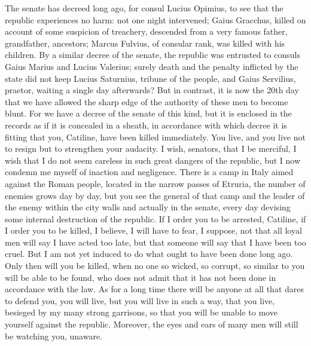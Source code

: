\documentclass[a4paper]{article}
\begin{document}
\begin{pairs}
\begin{Rightside}
    The senate has decreed long ago, for consul Lucius Opimius, to see that the republic experiences no harm: not one night intervened; Gaius Gracchus, killed on account of some suspicion of treachery, descended from a very famous father, grandfather, ancestors; Marcus Fulvius, of consular rank, was killed with his children. By a similar decree of the senate, the republic was entrusted to consuls Gaius Marius and Lucius Valerius; surely death and the penalty inflicted by the state did not keep Lucius Saturnius, tribune of the people, and Gaius Servilius, praetor, waiting a single day afterwards? But in contrast, it is now the 20th day that we have allowed the sharp edge of the authority of these men to become blunt. For we have a decree of the senate of this kind, but it is enclosed in the records as if it is concealed in a sheath, in accordance with which decree it is fitting that you, Catiline, have been killed immediately. You live, and you live not to resign but to strengthen your audacity. I wish, senators, that I be merciful, I wish that I do not seem careless in such great dangers of the republic, but I now condemn me myself of inaction and negligence.
    \pend
    \pstart
    There is a camp in Italy aimed against the Roman people, located in the narrow passes of Etruria, the number of enemies grows day by day, but you see the general of that camp and the leader of the enemy within the city walls and actually in the senate, every day devising some internal destruction of the republic. If I order you to be arrested, Catiline, if I order you to be killed, I believe, I will have to fear, I suppose, not that all loyal men will say I have acted too late, but that someone will say that I have been too cruel. But I am not yet induced to do what ought to have been done long ago. Only then will you be killed, when no one so wicked, so corrupt, so similar to you will be able to be found, who does not admit that it has not been done in accordance with the law.
    \pend
    \pstart
    As for a long time there will be anyone at all that dares to defend you, you will live, but you will live in such a way, that you live, besieged by my many strong garrisons, so that you will be unable to move yourself against the republic. Moreover, the eyes and ears of many men will still be watching you, unaware.
    \pend
    \endnumbering
  \end{Rightside}
\end{pairs}
\Columns
\end{document}
